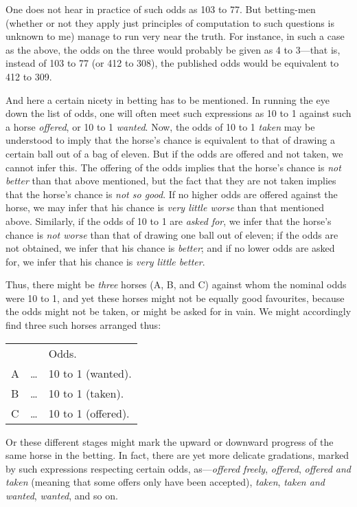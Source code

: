 \documentclass[letterpaper,12pt,oneside,openany]{memoir}
\begin{document}
One does not hear in practice of such odds as 103
to 77. But betting-men (whether or not they apply
just principles of computation to such questions is
unknown to me) manage to run very near the truth.
For instance, in such a case as the above, the odds on
the three would probably be given as 4 to 3---that is,
instead of 103 to 77 (or 412 to 308), the published
odds would be equivalent to 412 to 309.

And here a certain nicety in betting has to be mentioned.
In running the eye down the list of odds, one
will often meet such expressions as 10 to 1 against
such a horse \textit{offered}, or 10 to 1 \textit{wanted}. Now, the
odds of 10 to 1 \textit{taken} may be understood to imply that
the horse's chance is equivalent to that of drawing a
certain ball out of a bag of eleven. But if the odds
are offered and not taken, we cannot infer this. The
offering of the odds implies that the horse's chance is
\textit{not better} than that above mentioned, but the fact that
they are not taken implies that the horse's chance is
\textit{not so good}. If no higher odds are offered against the
horse, we may infer that his chance is \textit{very little worse}
than that mentioned above. Similarly, if the odds of
10 to 1 are \textit{asked for}, we infer that the horse's chance
is \textit{not worse} than that of drawing one ball out of eleven;
if the odds are not obtained, we infer that his chance is
\textit{better}; and if no lower odds are asked for, we infer that
his chance is \textit{very little better}.

Thus, there might be \textit{three} horses (A, B, and C)
against whom the nominal odds were 10 to 1, and yet
these horses might not be equally good favourites,
because the odds might not be taken, or might be
asked for in vain. We might accordingly find three
such horses arranged thus:

\begin{center}
\begin{tabular}{lcl}
&&Odds.\\
A &\ldots& 10 to 1 (wanted).\\
B &\ldots& 10 to 1 (taken).\\
C &\ldots& 10 to 1 (offered).\\
\end{tabular}
\end{center}

Or these different stages might mark the upward or
downward progress of the same horse in the betting.
In fact, there are yet more delicate gradations, marked
by such expressions respecting certain odds, as---\textit{offered freely},
\emph{offered}, \emph{offered and taken} (meaning that
some offers only have been accepted), \textit{taken}, \emph{taken and
wanted}, \emph{wanted}, and so on.
\end{document}
